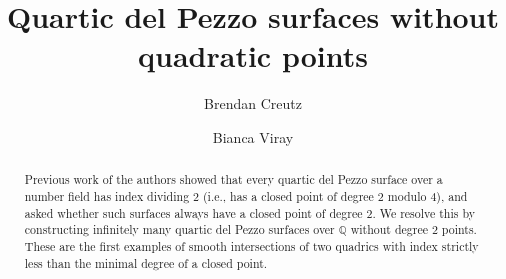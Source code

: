 \documentclass[12pt, reqno]{amsart}
\title{Quartic del Pezzo surfaces without quadratic points}
\author{Brendan Creutz}
\author{Bianca Viray}
\theoremstyle{definition}
\newcommand{\Q}{{\mathbb Q}}
\newcommand{\scrS}{{\mathscr S}}
\begin{document}
\begin{abstract}
Previous work of the authors showed that every quartic del Pezzo surface over a number field has index dividing $2$ (i.e., has a closed point of degree \(2\) modulo \(4\)), and asked whether such surfaces always have a closed point of degree $2$. We resolve this by constructing infinitely many quartic del Pezzo surfaces over $\Q$ without degree $2$ points. These are the first examples of smooth intersections of two quadrics with index strictly less than the minimal degree of a closed point.
\end{abstract}
	
\maketitle

%
%
%
%




\end{document}
